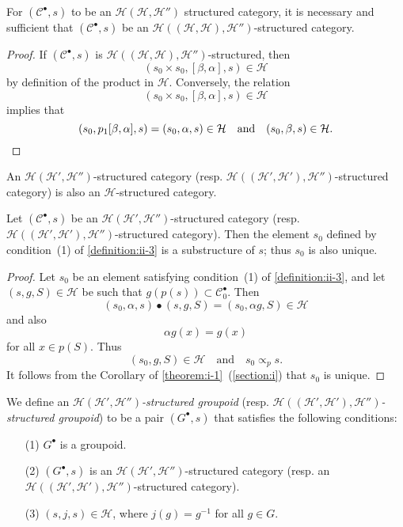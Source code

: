 \documentclass[a4paper,fleqn]{article}
\theoremstyle{plain}
\newenvironment{proposition}[1]
  {\renewcommand\theinnerproposition{#1}\innerproposition}
  {\endinnerproposition}
\theoremstyle{definition}
\newenvironment{definition}[1]
  {\renewcommand\theinnerdefinition{#1}\innerdefinition}
  {\endinnerdefinition}
\newcommand{\oldpage}[1]{{\marginpar{\footnotesize$\bigg\vert$\,\,\,\,\textit{p.~#1}}}}
\newcommand{\textand}{\quad\text{and}\quad}
\newcommand{\CC}{\mathcal{C}}
\newcommand{\HH}{\mathcal{H}}
\newcommand{\subs}{\mathrel{\propto}}
\begin{document}
\begin{proposition}{5}
\label{proposition:ii-5}
  For $(\CC^\bullet,s)$ to be an $\HH(\HH,\HH'')$ structured category, it is necessary and sufficient that $(\CC^\bullet,s)$ be an $\HH((\HH,\HH),\HH'')$-structured category.
\end{proposition}

\begin{proof}
  If $(\CC^\bullet,s)$ is $\HH((\HH,\HH),\HH'')$-structured, then
  \[
    (s_0\times s_0,[\beta,\alpha],s)
    \in\HH
  \]
  by definition of the product in $\HH$.
  Conversely, the relation
  \[
    (s_0\times s_0,[\beta,\alpha],s)
    \in\HH
  \]
  implies that
  \[
    (s_0,p_1[\beta,\alpha],s)
    = (s_0,\alpha,s)\in\HH
    \textand
    (s_0,\beta,s)
    \in\HH.
    \qedhere
  \]
\end{proof}

An $\HH(\HH',\HH'')$-structured category (resp. $\HH((\HH',\HH'),\HH'')$-structured category) is also an $\HH$-structured category.

\begin{proposition}{6}
\label{proposition:ii-6}
  Let $(\CC^\bullet,s)$ be an $\HH(\HH',\HH'')$-structured category (resp. $\HH((\HH',\HH'),\HH'')$-structured category).
  Then the element $s_0$ defined by condition~(1) of \cref{definition:ii-3} is a substructure of $s$; thus $s_0$ is also unique.
\end{proposition}

\begin{proof}
  \oldpage{384}
  Let $s_0$ be an element satisfying condition~(1) of \cref{definition:ii-3}, and let $(s,g,S)\in\HH$ be such that $g(p(s))\subset\CC_0^\bullet$.
  Then
  \[
    (s_0,\alpha,s)\bullet(s,g,S)
    = (s_0,\alpha g,S)\in\HH
  \]
  and also
  \[
    \alpha g(x)
    = g(x)
  \]
  for all $x\in p(S)$.
  Thus
  \[
    (s_0,g,S)\in\HH
    \textand
    s_0\subs_p s.
  \]
  It follows from the Corollary of \cref{theorem:i-1}~(\cref{section:i}) that $s_0$ is unique.
\end{proof}

\begin{definition}{4}
\label{definition:ii-4}
  We define an \emph{$\HH(\HH',\HH'')$-structured groupoid} (resp. \emph{$\HH((\HH',\HH'),\HH'')$-structured groupoid}) to be a pair $(G^\bullet,s)$ that satisfies the following conditions:
  \begin{enumerate}
    \item[\normalfont(1)]
      $G^\bullet$ is a groupoid.

    \item[\normalfont(2)]
      $(G^\bullet,s)$ is an $\HH(\HH',\HH'')$-structured category (resp. an $\HH((\HH',\HH'),\HH'')$-structured category).

    \item[\normalfont(3)]
      $(s,j,s)\in\HH$, where $j(g)=g^{-1}$ for all $g\in G$.
  \end{enumerate}
\end{definition}
\end{document}
